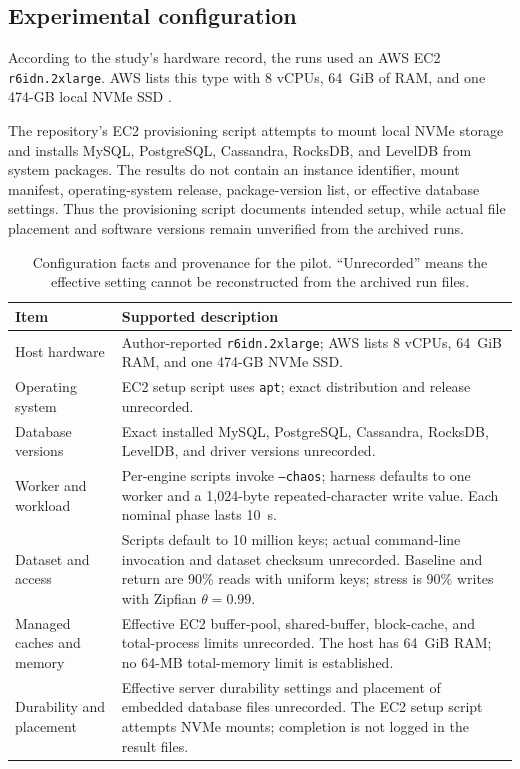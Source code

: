 \documentclass[10pt]{article}
\begin{document}
\subsection{Experimental configuration}
According to the study's hardware record, the runs used an AWS EC2 \texttt{r6idn.2xlarge}. AWS lists this type with 8 vCPUs, 64~GiB of RAM, and one 474-GB local NVMe SSD \cite{awsr6idn}.

The repository's EC2 provisioning script attempts to mount local NVMe storage and installs MySQL, PostgreSQL, Cassandra, RocksDB, and LevelDB from system packages. The results do not contain an instance identifier, mount manifest, operating-system release, package-version list, or effective database settings. Thus the provisioning script documents intended setup, while actual file placement and software versions remain unverified from the archived runs.

\begin{table}[htbp]
\centering\small
\caption{Configuration facts and provenance for the pilot. ``Unrecorded'' means the effective setting cannot be reconstructed from the archived run files.}
\label{tab:configuration}
\begin{tabular}{@{}p{.27\linewidth}p{.62\linewidth}@{}}\toprule
Item & Supported description \\ \midrule
Host hardware & Author-reported \texttt{r6idn.2xlarge}; AWS lists 8 vCPUs, 64~GiB RAM, and one 474-GB NVMe SSD. \\
Operating system & EC2 setup script uses \texttt{apt}; exact distribution and release unrecorded. \\
Database versions & Exact installed MySQL, PostgreSQL, Cassandra, RocksDB, LevelDB, and driver versions unrecorded. \\
Worker and workload & Per-engine scripts invoke \texttt{--chaos}; harness defaults to one worker and a 1,024-byte repeated-character write value. Each nominal phase lasts 10~s. \\
Dataset and access & Scripts default to 10 million keys; actual command-line invocation and dataset checksum unrecorded. Baseline and return are 90\% reads with uniform keys; stress is 90\% writes with Zipfian $\theta=0.99$. \\
Managed caches and memory & Effective EC2 buffer-pool, shared-buffer, block-cache, and total-process limits unrecorded. The host has 64~GiB RAM; no 64-MB total-memory limit is established. \\
Durability and placement & Effective server durability settings and placement of embedded database files unrecorded. The EC2 setup script attempts NVMe mounts; completion is not logged in the result files. \\
\bottomrule\end{tabular}
\end{table}
\end{document}
